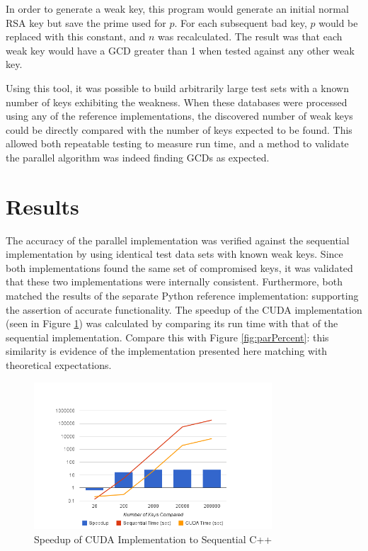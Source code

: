 \documentclass[10pt, conference]{./IEEEtran}
\begin{document}
In order to generate a weak key, this program would generate an initial 
normal RSA key but save the prime used for $p$. For each subsequent bad key, 
$p$ would be replaced with this constant, and $n$ was recalculated. The 
result was that each weak key would have a GCD greater than 1 when 
tested against any other weak key. 

Using this tool, it was possible to build arbitrarily large test sets with a 
known number of keys exhibiting the weakness. When these databases 
were processed using any of the reference implementations, the 
discovered number of weak keys could be directly compared with the 
number of keys expected to be found. This allowed both repeatable testing to 
measure run time, and a method to validate the parallel algorithm was indeed 
finding GCDs as expected. 

\section{Results}
The accuracy of the parallel implementation was verified against the 
sequential implementation by using identical test data sets with known 
weak keys. Since both implementations found the same set of compromised keys,
it was validated that these two implementations 
were internally consistent. Furthermore, both matched the results of the 
separate Python reference implementation: supporting the assertion of accurate 
functionality. The speedup of the CUDA implementation (seen in Figure 
\ref{fig:speedup}) was calculated by comparing its run time with that of the sequential 
implementation. Compare this 
with Figure \ref{fig:parPercent}: this similarity is evidence of the 
implementation presented here matching with theoretical expectations.

\begin{figure}
   \centering
   \includegraphics[width=3.5in]{chart_1.png}
   \caption{Speedup of CUDA Implementation to Sequential C++}
   \label{fig:speedup}
\end{figure}
\end{document}
